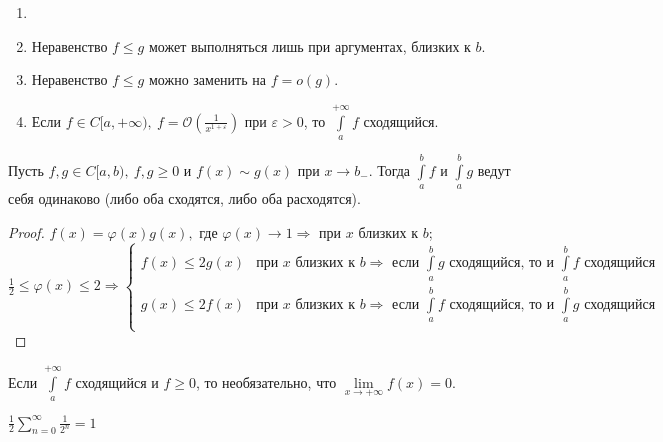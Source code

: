 \begin{remark}
    \begin{enumerate}
        \item[]
        \item Неравенство $f\leq g$ может выполняться лишь при аргументах, близких к $b$.
        \item Неравенство $f\leq g$ можно заменить на $f=o(g)$.
        \item Если $f\in C[a,+\infty),\ f=\mathcal{O}(\frac{1}{x^{1+\varepsilon}})$ при $\varepsilon>0$, то $\int\limits_a^{+\infty} f$ сходящийся.
    \end{enumerate}
\end{remark}

\begin{corollary}
    Пусть $f,g\in C[a,b),\ f,g\geq 0$ и $f(x)\sim g(x)$ при $x\rightarrow b_-$. Тогда $\int\limits_a^b f$ и $\int\limits_a^b g$ ведут себя одинаково (либо оба сходятся, либо оба расходятся).
\end{corollary}

\begin{proof}
    $f(x)=\varphi(x)g(x),$ где $\varphi(x)\rightarrow 1\Rightarrow$ при $x$ близких к $b$; $\frac{1}{2}\leq \varphi(x)\leq 2\Rightarrow \begin{cases}
        f(x) \leq 2 g(x) & \text{при $x$ близких к $b\Rightarrow$ если $\int\limits_a^b g$ сходящийся, то и $\int\limits_a^b f$ сходящийся} \\
        g(x) \leq 2 f(x) & \text{при $x$ близких к $b\Rightarrow$ если $\int\limits_a^b f$ сходящийся, то и $\int\limits_a^b g$ сходящийся} \\
    \end{cases}$
\end{proof}

\begin{remark}
    Если $\int\limits_a^{+\infty}f$ сходящийся и $f\geq 0$, то необязательно, что $\lim\limits_{x\rightarrow +\infty} f(x)=0$.

    $\frac{1}{2}\sum\limits_{n=0}^\infty\frac{1}{2^n}=1$
\end{remark}